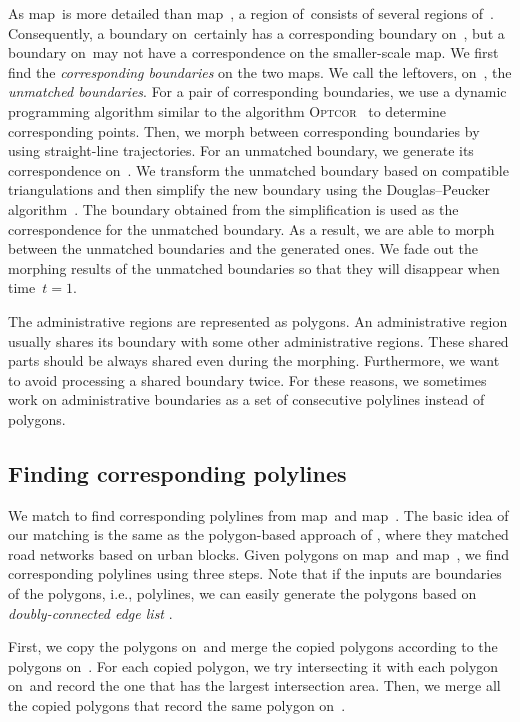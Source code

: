 As map~\ml is more detailed than map~\ms, 
a region of~\ms consists of several regions of~\ml. 
Consequently, a boundary on~\ms certainly 
has a corresponding boundary on~\ml, 
but a boundary on~\ml may not
have a correspondence on the smaller-scale map. 
We first find the \emph{corresponding boundaries} on the two maps.
We call the leftovers, on~\ml, the \emph{unmatched boundaries}. 
For a pair of corresponding boundaries, we
use a dynamic programming algorithm similar to the algorithm 
\textsc{Optcor}~\parencite{Noellenburg2008} to determine 
corresponding points.
Then, we morph between corresponding boundaries 
by using straight-line trajectories. 
For an unmatched boundary, we generate its correspondence on~\ms.
We transform the unmatched boundary based on compatible triangulations 
and then simplify the new boundary using the 
Douglas--Peucker algorithm~\parencite{Douglas1973}.
The boundary obtained from the simplification is used as 
the correspondence for the unmatched boundary.
As a result, we are able to morph 
between the unmatched boundaries and the generated ones. 
We fade out the morphing results of the unmatched boundaries
so that they will disappear when time~$t=1$.

The administrative regions are represented as polygons. 
An administrative region usually shares its boundary 
with some other administrative regions. 
These shared parts should be always shared even during the morphing.
Furthermore, we want to avoid processing a shared boundary twice.
For these reasons, we sometimes work on administrative boundaries
as a set of consecutive polylines instead of polygons.



\subsection{Finding corresponding polylines}
\label{sec:Admin_Preprocessing}

We match to find corresponding polylines 
from map~\ml and map~\ms.
The basic idea of our matching is the same as the polygon-based 
approach of \parencite{Fan2016Matching}, where they matched road 
networks based on urban blocks.
Given polygons on map~\ml and map~\ms, 
we find corresponding polylines using three steps. 
Note that if the inputs are boundaries of the polygons, 
i.e., polylines, 
we can easily generate the polygons 
based on \emph{doubly-connected edge list} 
\parencite[]{deBerg2008}.

First, we copy the polygons on~\ml and 
merge the copied polygons according to the polygons on~\ms. 
For each copied polygon, 
we try intersecting it with each polygon on~\ms and 
record the one that has the largest intersection area. 
Then, we merge all the copied 
polygons that record the same polygon on~\ms.

